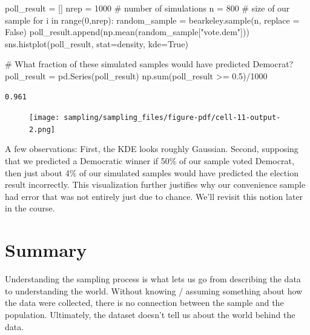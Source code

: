 \documentclass[
  letterpaper,
  DIV=11,
  numbers=noendperiod]{scrreprt}
\newenvironment{Shaded}{\begin{snugshade}}{\end{snugshade}}
\newcommand{\BuiltInTok}[1]{\textcolor[rgb]{0.00,0.23,0.31}{#1}}
\newcommand{\CommentTok}[1]{\textcolor[rgb]{0.37,0.37,0.37}{#1}}
\newcommand{\ControlFlowTok}[1]{\textcolor[rgb]{0.00,0.23,0.31}{#1}}
\newcommand{\DecValTok}[1]{\textcolor[rgb]{0.68,0.00,0.00}{#1}}
\newcommand{\FloatTok}[1]{\textcolor[rgb]{0.68,0.00,0.00}{#1}}
\newcommand{\KeywordTok}[1]{\textcolor[rgb]{0.00,0.23,0.31}{#1}}
\newcommand{\NormalTok}[1]{\textcolor[rgb]{0.00,0.23,0.31}{#1}}
\newcommand{\OperatorTok}[1]{\textcolor[rgb]{0.37,0.37,0.37}{#1}}
\newcommand{\StringTok}[1]{\textcolor[rgb]{0.13,0.47,0.30}{#1}}
\newcommand{\VariableTok}[1]{\textcolor[rgb]{0.07,0.07,0.07}{#1}}
\begin{document}
\begin{Shaded}
\begin{Highlighting}[]
\NormalTok{poll\_result }\OperatorTok{=}\NormalTok{ []}
\NormalTok{nrep }\OperatorTok{=} \DecValTok{1000}   \CommentTok{\# number of simulations}
\NormalTok{n }\OperatorTok{=} \DecValTok{800}       \CommentTok{\# size of our sample}
\ControlFlowTok{for}\NormalTok{ i }\KeywordTok{in} \BuiltInTok{range}\NormalTok{(}\DecValTok{0}\NormalTok{,nrep):}
\NormalTok{    random\_sample }\OperatorTok{=}\NormalTok{ bearkeley.sample(n, replace }\OperatorTok{=} \VariableTok{False}\NormalTok{)}
\NormalTok{    poll\_result.append(np.mean(random\_sample[}\StringTok{"vote.dem"}\NormalTok{]))}
\NormalTok{sns.histplot(poll\_result, stat}\OperatorTok{=}\StringTok{\textquotesingle{}density\textquotesingle{}}\NormalTok{, kde}\OperatorTok{=}\VariableTok{True}\NormalTok{)}

\CommentTok{\# What fraction of these simulated samples would have predicted Democrat?}
\NormalTok{poll\_result }\OperatorTok{=}\NormalTok{ pd.Series(poll\_result)}
\NormalTok{np.}\BuiltInTok{sum}\NormalTok{(poll\_result }\OperatorTok{\textgreater{}=} \FloatTok{0.5}\NormalTok{)}\OperatorTok{/}\DecValTok{1000}
\end{Highlighting}
\end{Shaded}

\begin{verbatim}
0.961
\end{verbatim}

\begin{figure}[H]

{\centering \texttt{[image: sampling/sampling\_files/figure-pdf/cell-11-output-2.png]}

}

\end{figure}

A few observations: First, the KDE looks roughly Gaussian. Second,
supposing that we predicted a Democratic winner if 50\% of our sample
voted Democrat, then just about 4\% of our simulated samples would have
predicted the election result incorrectly. This visualization further
justifies why our convenience sample had error that was not entirely
just due to chance. We'll revisit this notion later in the course.

\hypertarget{summary}{%
\section{Summary}\label{summary}}

Understanding the sampling process is what lets us go from describing
the data to understanding the world. Without knowing / assuming
something about how the data were collected, there is no connection
between the sample and the population. Ultimately, the dataset doesn't
tell us about the world behind the data.
\end{document}

